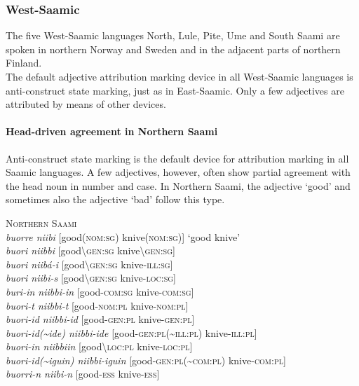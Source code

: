 \subsubsection{West-Saamic}
The five West-Saamic languages North, Lule, Pite, Ume and South Saami are spoken in northern Norway and Sweden and in the adjacent parts of northern Finland.\\

\noindent The default adjective attribution marking device in all West-Saamic languages is anti-construct state marking, just as in East-Saamic. Only a few adjectives are attributed by means of other devices.

\paragraph{Head-driven agreement in Northern Saami}
Anti-construct state marking is the default device for attribution marking in all Saamic languages. A few adjectives, however, often show partial agreement with the head noun in number and case. In Northern Saami, the adjective ‘good’ and sometimes also the adjective ‘bad’ follow this type.
\begin{exe}
\ex \textsc{Northern Saami} \citep[83]{nickel1990}\\
\textit{buorre niibi} [good(\textsc{nom:sg}) knive(\textsc{nom:sg})] ‘good knive’\\
\textit{buori niibbi} [good\textbackslash\textsc{gen:sg} knive\textbackslash\textsc{gen:sg}]\\
\textit{buori niibá-i} [good\textbackslash\textsc{gen:sg} knive-\textsc{ill:sg}]\\
\textit{buori niibi-s} [good\textbackslash\textsc{gen:sg} knive-\textsc{loc:sg}]\\
\textit{buri-in niibbi-in} [good-\textsc{com:sg} knive-\textsc{com:sg}]\\
\textit{buori-t niibbi-t} [good-\textsc{nom:pl} knive-\textsc{nom:pl}]\\
\textit{buori-id niibbi-id} [good-\textsc{gen:pl} knive-\textsc{gen:pl}]\\
\textit{buori-id(\textasciitilde ide) niibbi-ide} [good-\textsc{gen:pl}(\textasciitilde \textsc{ill:pl}) knive-\textsc{ill:pl}]\\
\textit{buori-in niibbiin} [good\textbackslash\textsc{loc:pl} knive-\textsc{loc:pl}]\\
\textit{buori-id(\textasciitilde iguin) niibbi-iguin} [good-\textsc{gen:pl}(\textasciitilde \textsc{com:pl}) knive-\textsc{com:pl}]\\
\textit{buorri-n niibi-n} [good-\textsc{ess} knive-\textsc{ess}]
\end{exe}

